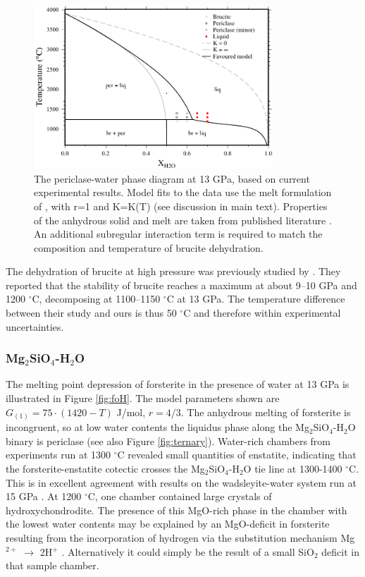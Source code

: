 \documentclass[review]{elsarticle}
\begin{document}
\begin{figure}[ht!]
  \centering
      \includegraphics[width=0.8\textwidth]{figures/periclase}
  \caption{The periclase-water phase diagram at 13 GPa, based on current experimental results. Model fits to the data use the melt formulation of \cite{SS1985}, with r=1 and K=K(T) (see discussion in main text). Properties of the anhydrous solid and melt are taken from published literature \citep{SLB2011, DKS2013}. An additional subregular interaction term is required to match the composition and temperature of brucite dehydration.}
  \label{fig:MH}
\end{figure}



The dehydration of brucite at high pressure was previously studied by \cite{FIYKFO2005}. They reported that the stability of brucite reaches a maximum at about 9--10 GPa and 1200 $^{\circ}$C, decomposing at 1100--1150 $^{\circ}$C at 13 GPa. The temperature difference between their study and ours is thus 50 $^{\circ}$C and therefore within experimental uncertainties. 


\clearpage
\subsubsection{Mg$_2$SiO$_4$-H$_2$O}
The melting point depression of forsterite in the presence of water at 13 GPa is illustrated in Figure \ref{fig:foH}. The model parameters shown are $G_{(1)} = 75 \cdot (1420-T)$ J/mol, $r=4/3$. The anhydrous melting of forsterite is incongruent, so at low water contents the liquidus phase along the Mg$_2$SiO$_4$-H$_2$O binary is periclase (see also Figure \ref{fig:ternary}). Water-rich chambers from experiments run at 1300 $^{\circ}$C revealed small quantities of enstatite, indicating that the forsterite-enstatite cotectic crosses the Mg$_2$SiO$_4$-H$_2$O tie line at 1300-1400 $^{\circ}$C. This is in excellent agreement with results on the wadsleyite-water system run at 15 GPa \citep{DDFK2005, LSOK2011}. At 1200 $^{\circ}$C, one chamber contained large crystals of hydroxychondrodite. The presence of this MgO-rich phase in the chamber with the lowest water contents may be explained by an MgO-deficit in forsterite resulting from the incorporation of hydrogen via the substitution mechanism Mg$^{2+}$ $\rightarrow$ 2H$^+$ \citep{KB2006}. Alternatively it could simply be the result of a small SiO$_2$ deficit in that sample chamber. 
\end{document}
